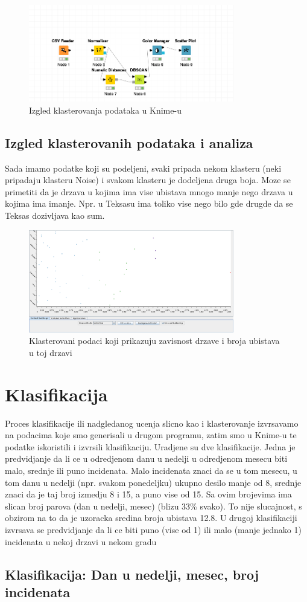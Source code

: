 \documentclass[11pt]{article} %
\begin{document}
	\begin{figure}[h!]
	\centering
		\includegraphics[width=0.8\textwidth]{klasterovanjeKnime}
		\caption{Izgled klasterovanja podataka u Knime-u}
	\end{figure}
	
	
	\newpage
	\subsection{Izgled klasterovanih podataka i analiza}
	Sada imamo podatke koji su podeljeni, svaki pripada nekom klasteru (neki pripadaju klasteru Noise) i svakom klasteru je dodeljena druga boja. Moze se 
	primetiti da je drzava u kojima ima vise ubistava mnogo manje nego drzava u kojima ima imanje. Npr. u Teksasu ima toliko vise nego bilo gde drugde da se 
	Teksas dozivljava kao sum.
	
	\begin{figure}[h!]
	\centering
		\includegraphics[width=0.8\textwidth]{klasterovanje1}
		\caption{Klasterovani podaci koji prikazuju zavisnost drzave i broja ubistava u toj drzavi}
	\end{figure}


	\newpage
	\section{Klasifikacija}
	Proces klasifikacije ili nadgledanog ucenja slicno kao i klasterovanje izvrsavamo na podacima koje smo generisali u drugom programu, zatim smo u 
	Knime-u te podatke iskoristili i izvrsili klasifikaciju. 
	Uradjene su dve klasifikacije. 
	Jedna je predvidjanje da li ce u odredjenom danu u nedelji u odredjenom mesecu biti malo, srednje ili puno incidenata. 
	Malo incidenata znaci da se u tom mesecu, u tom danu u nedelji (npr. svakom ponedeljku) ukupno desilo manje od 8, srednje znaci da je taj broj izmedju 8 i 15, 
	a puno vise od 15. Sa ovim brojevima ima slican broj parova (dan u nedelji, mesec) (blizu 33\% svako). To nije slucajnost, s obzirom na to da je 
	uzoracka sredina broja ubistava 12.8.
	U drugoj klasifikaciji izvrsava se predvidjanje da li ce biti puno (vise od 1) ili malo (manje jednako 1) incidenata u nekoj drzavi u nekom gradu
	\subsection{Klasifikacija: Dan u nedelji, mesec, broj incidenata}	
\end{document}
